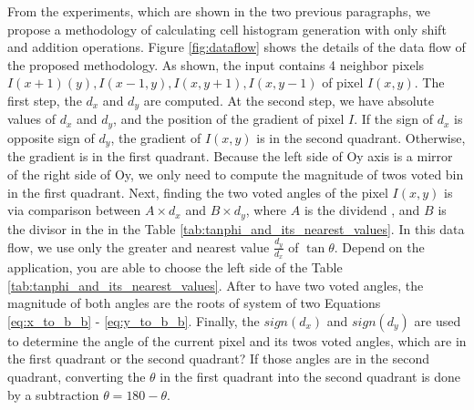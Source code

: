 
From the experiments, which are shown in the two previous paragraphs, we propose
a methodology of calculating cell histogram generation with only shift and
addition operations.
Figure \ref{fig:dataflow} shows the details of the data flow of the proposed
methodology.
As shown, the input contains 4 neighbor pixels $I(x+1)(y), I(x-1,y), I(x, y +
1), I(x, y - 1)$  of pixel $I(x,y)$.
The first step, the $d_x$ and $d_y$ are computed.
At the second step, we have absolute values of $d_x$ and $d_y$, and the
position of the gradient of pixel $I$.
If the sign of $d_x$ is opposite  sign of $d_y$, the gradient of $I(x,y)$ is in
the second quadrant.
Otherwise, the gradient is in the first quadrant.
Because the left side of Oy axis is a mirror of the right side of Oy, we only
need to compute the magnitude of twos voted bin in the first quadrant.
Next, finding the two voted angles of the pixel $I(x,y)$ is via comparison
between $A \times d_x$ and $B \times d_y$, where $A$ is the dividend ,
and $B$ is the divisor in the in the Table
\ref{tab:tanphi_and_its_nearest_values}.
In this data flow, we use only the greater and nearest value
$\frac{d_y}{d_x}$ of $\tan\theta$.
Depend on the application, you are able to choose the left side of the Table
\ref{tab:tanphi_and_its_nearest_values}.
After to have two voted angles, the magnitude of both angles are the roots of system
of two Equations \ref{eq:x_to_b_b} - \ref{eq:y_to_b_b}.
Finally, the $sign(d_x)$ and $sign(d_y)$ are used to determine the angle of the
current pixel and its twos voted angles, which are in the first quadrant or the second
quadrant?
If those angles are in the second quadrant, converting  the $\theta$ in the first
quadrant into the second quadrant is done by a subtraction $\theta = 180 - \theta$.


